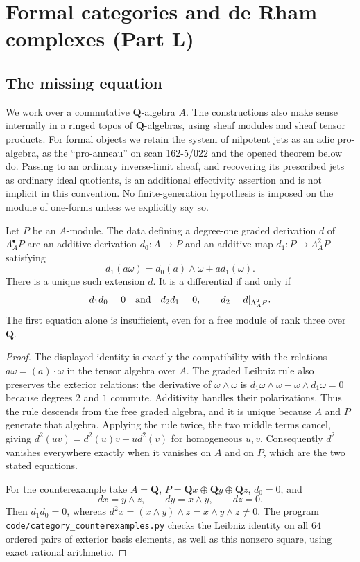 \section{Formal categories and de Rham complexes (Part L)}\label{sec:categoryL}

\subsection{The missing equation}
We work over a commutative $\mathbf Q$-algebra $A$.  The constructions
also make sense internally in a ringed topos of $\mathbf Q$-algebras,
using sheaf modules and sheaf tensor products.  For formal objects we
retain the system of nilpotent jets as an adic pro-algebra, as the
``pro-anneau'' on scan 162-5/022 and the opened theorem below do.
Passing to an ordinary inverse-limit sheaf, and recovering its prescribed
jets as ordinary ideal quotients, is an additional effectivity assertion
and is not implicit in this convention.  No finite-generation hypothesis
is imposed on the module of one-forms unless we explicitly say so.

\begin{proposition}\label{cat:L1}
Let $P$ be an $A$-module.  The data defining a degree-one graded derivation
$d$ of $\Lambda_A^\bullet P$ are an additive derivation
$d_0:A\to P$ and an additive map $d_1:P\to\Lambda_A^2P$ satisfying
\[
 d_1(a\omega)=d_0(a)\wedge\omega+a d_1(\omega).
\]
There is a unique such extension $d$.  It is a differential if and only if
\[
 d_1d_0=0\quad\hbox{and}\quad d_2d_1=0,
 \qquad d_2=d|_{\Lambda_A^2P}.
\]
The first equation alone is insufficient, even for a free module of rank
three over $\mathbf Q$.
\end{proposition}
\begin{proof}
The displayed identity is exactly the compatibility with the relations
$a\omega=(a)\cdot\omega$ in the tensor algebra over $A$.  The graded
Leibniz rule also preserves the exterior relations: the derivative of
$\omega\wedge\omega$ is
$d_1\omega\wedge\omega-\omega\wedge d_1\omega=0$ because degrees
$2$ and $1$ commute.  Additivity handles their polarizations.  Thus the
rule descends from the free graded algebra, and it is unique because $A$
and $P$ generate that algebra.  Applying the rule twice, the two middle
terms cancel, giving
$d^2(uv)=d^2(u)v+u d^2(v)$ for homogeneous $u,v$.
Consequently $d^2$ vanishes everywhere exactly when it vanishes on $A$
and on $P$, which are the two stated equations.

For the counterexample take $A=\mathbf Q$,
$P=\mathbf Qx\oplus\mathbf Qy\oplus\mathbf Qz$, $d_0=0$, and
\[
 dx=y\wedge z,\qquad dy=x\wedge y,\qquad dz=0.
\]
Then $d_1d_0=0$, whereas
$d^2x=(x\wedge y)\wedge z=x\wedge y\wedge z\ne0$.
The program \texttt{code/category\_counterexamples.py} checks the
Leibniz identity on all $64$ ordered pairs of exterior basis elements,
as well as this nonzero square, using exact rational arithmetic.
\end{proof}

